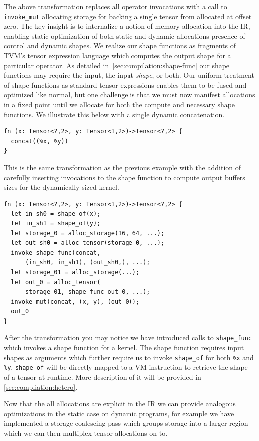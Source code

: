 The above transformation replaces all operator invocations with a call to \verb|invoke_mut| allocating storage
for backing a single tensor from allocated at offset zero.
The key insight is to internalize a notion of memory allocation into the IR, enabling static optimization of
both static and dynamic allocations presence of control and dynamic shapes. We realize our shape functions as fragments of TVM's tensor expression language which computes the output shape for a particular operator. As detailed in~\autoref{sec:compilation:shape-func} our shape functions may require the input, the input \textit{shape}, or both.
Our uniform treatment of shape functions as standard tensor expressions enables them to be fused and optimized like normal, but one challenge is that we must now manifest allocations in a fixed point until we allocate for both the compute and necessary shape functions. We illustrate this below with a single dynamic concatenation.

\begin{verbatim}
fn (x: Tensor<?,2>, y: Tensor<1,2>)->Tensor<?,2> {
  concat((%x, %y))
}
\end{verbatim}

This is the same transformation as the previous example with the addition of carefully inserting
invocations to the shape function to compute output buffers sizes for the dynamically sized kernel.

\begin{verbatim}
fn (x: Tensor<?,2>, y: Tensor<1,2>)->Tensor<?,2> {
  let in_sh0 = shape_of(x);
  let in_sh1 = shape_of(y);
  let storage_0 = alloc_storage(16, 64, ...);
  let out_sh0 = alloc_tensor(storage_0, ...);
  invoke_shape_func(concat,
      (in_sh0, in_sh1), (out_sh0,), ...);
  let storage_01 = alloc_storage(...);
  let out_0 = alloc_tensor(
      storage_01, shape_func_out_0, ...);
  invoke_mut(concat, (x, y), (out_0));
  out_0
}
\end{verbatim}

After the transformation you may notice we have introduced calls to \verb|shape_func| which invokes a shape function for a kernel. The shape function requires input shapes as arguments which further require us to invoke \verb|shape_of| for both \verb|%x| and \verb|%y|. \verb|shape_of| will be directly mapped to a VM instruction to retrieve the shape of a tensor at runtime. More description of it will be provided in \autoref{sec:compliation:hetero}.

Now that the all allocations are explicit in the IR we can provide analogous optimizations in the static
case on dynamic programs, for example we have implemented a storage coalescing pass which groups storage
into a larger region which we can then multiplex tensor allocations on to.


